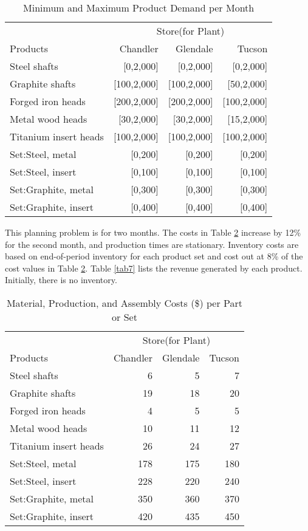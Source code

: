 \documentclass[12pt]{article}
\begin{document}
	\begin{table}[H]
		\centering
		\setlength{\belowcaptionskip}{0.1cm} 
		\caption{Minimum and Maximum Product Demand per Month}
		\label{tab5}
		\begin{tabular}{lrrr}
			\hline
			\hline
		 & \multicolumn{3}{c}{Store(for Plant)} \\
		Products&Chandler  &  Glendale  &  Tucson    \\\hline
		Steel shafts& [0,2,000]&[0,2,000]&[0,2,000]\\
		Graphite shafts& [100,2,000]&[100,2,000]&[50,2,000]\\
		Forged iron heads&[200,2,000]&[200,2,000]&[100,2,000]\\
		Metal wood heads&[30,2,000]&[30,2,000]&[15,2,000]\\
		Titanium insert heads&[100,2,000]&[100,2,000]&[100,2,000]\\
		Set:Steel, metal&[0,200]&[0,200]&[0,200]\\
		Set:Steel, insert&[0,100]&[0,100]&[0,100]\\
		Set:Graphite, metal&[0,300]&[0,300]&[0,300]\\
		Set:Graphite, insert&[0,400]&[0,400]&[0,400]\\
		\hline
		\hline  
		\end{tabular}
		\end{table}

		\noindent This planning problem is for two months. The costs in Table \ref{tab6} increase by 12\% for the second month, and production times are stationary. Inventory costs are based on end-of-period inventory for each product set and cost out at 8\% of the cost values in Table \ref{tab6}. Table \ref{tab7} lists the revenue generated by each product. Initially, there is no inventory.
		\begin{table}[H]
			\centering
			\setlength{\belowcaptionskip}{0.1cm} 
			\caption{Material, Production, and Assembly Costs (\$) per Part or Set} 
			\label{tab6}
			\begin{tabular}{lrrr}
				\hline
				\hline
			 & \multicolumn{3}{c}{Store(for Plant)} \\
			Products&Chandler  &  Glendale  &  Tucson    \\\hline
			Steel shafts& 6&5&7\\
			Graphite shafts& 19&	18&20\\
			Forged iron heads&4&5&5\\
			Metal wood heads&10&11&12\\
			Titanium insert heads&26&24&27\\
			Set:Steel, metal&178&175&180\\
			Set:Steel, insert&228&220&240\\
			Set:Graphite, metal&350&360&370\\
			Set:Graphite, insert&420&435&450 \\
			\hline
			\hline  
			\end{tabular}
			\end{table}
\end{document}
